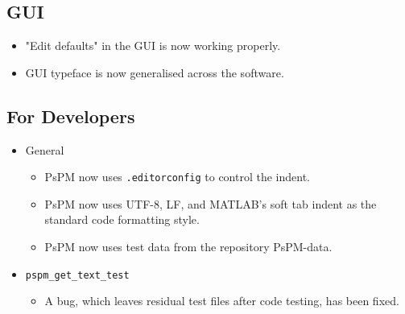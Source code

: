 \documentclass[english]{article}
\numberwithin{equation}{section}
\numberwithin{figure}{section}
\begin{document}
\subsection*{GUI}
\begin{itemize}
\item "Edit defaults" in the GUI is now working properly.
\item GUI typeface is now generalised across the software.
\end{itemize}

\subsection*{For Developers}
\begin{itemize}
\item General
  \begin{itemize}
  \item PsPM now uses \texttt{.editorconfig} to control the indent.
  \item PsPM now uses UTF-8, LF, and MATLAB's soft tab indent as the standard code formatting style.
  \item PsPM now uses test data from the repository PsPM-data.
  \end{itemize}
\item \texttt{pspm\_get\_text\_test}
  \begin{itemize}
  \item A bug, which leaves residual test files after code testing, has been fixed.
  \end{itemize}
\end{itemize}
\end{document}
